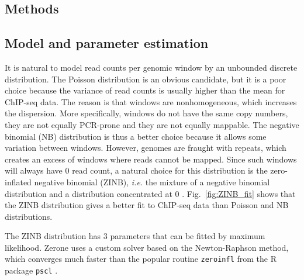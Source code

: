 \documentclass{bioinfo}
\begin{document}
\begin{methods}
\section{Methods}

\subsection{Model and parameter estimation}
\label{sub:hmm}
It is natural to model read counts per genomic window by an unbounded
discrete distribution. The Poisson distribution is an obvious candidate,
but it is a poor choice because the variance of read counts is usually
higher than the mean for ChIP-seq data. The reason is that windows
are nonhomogeneous, which increases the dispersion. More specifically,
windows do not have the same copy numbers, they are not equally PCR-prone
and they are not equally mappable.
The negative binomial (NB) distribution is thus a better choice
because it allows some variation between windows. However, genomes
are fraught with repeats, which creates an excess of windows where
reads cannot be mapped. Since such windows will always have 0 read
count, a natural choice for this distribution is the zero-inflated
negative binomial (ZINB), \textit{i.e.} the mixture of a negative
binomial distribution and a distribution concentrated at 0
\citep{pmid21787385}.
Fig.~\ref{fig:ZINB_fit} shows that the
ZINB distribution gives a better fit to ChIP-seq data than Poisson
and NB distributions.

The ZINB distribution has 3 parameters that can be fitted by maximum
likelihood. Zerone uses a custom solver based on the Newton-Raphson
method, which converges much faster than the popular routine
\texttt{zeroinfl} \citep{psclb} from the R package
\texttt{pscl} \citep{R,pscla}.


\end{methods}
\end{document}
